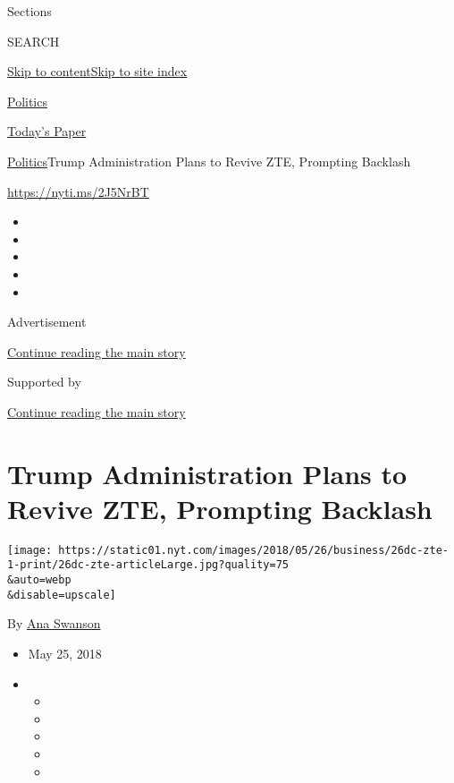 Sections

SEARCH

\protect\hyperlink{site-content}{Skip to
content}\protect\hyperlink{site-index}{Skip to site index}

\href{https://www.nytimes.com/section/politics}{Politics}

\href{https://myaccount.nytimes.com/auth/login?response_type=cookie\&client_id=vi}{}

\href{https://www.nytimes.com/section/todayspaper}{Today's Paper}

\href{/section/politics}{Politics}\textbar{}Trump Administration Plans
to Revive ZTE, Prompting Backlash

\url{https://nyti.ms/2J5NrBT}

\begin{itemize}
\item
\item
\item
\item
\item
\end{itemize}

Advertisement

\protect\hyperlink{after-top}{Continue reading the main story}

Supported by

\protect\hyperlink{after-sponsor}{Continue reading the main story}

\hypertarget{trump-administration-plans-to-revive-zte-prompting-backlash}{%
\section{Trump Administration Plans to Revive ZTE, Prompting
Backlash}\label{trump-administration-plans-to-revive-zte-prompting-backlash}}

\texttt{[image: https://static01.nyt.com/images/2018/05/26/business/26dc-zte-1-print/26dc-zte-articleLarge.jpg?quality=75\\\&auto=webp\\\&disable=upscale]}

By \href{https://www.nytimes.com/by/ana-swanson}{Ana Swanson}

\begin{itemize}
\item
  May 25, 2018
\item
  \begin{itemize}
  \item
  \item
  \item
  \item
  \item
  \end{itemize}
\end{itemize}

